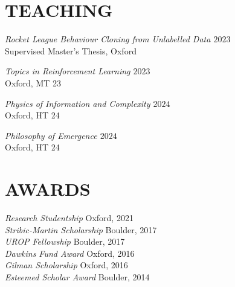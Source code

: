 \documentclass[margin]{res}
\begin{document}
\begin{resume}
                \section{TEACHING}
                {\sl Rocket League Behaviour Cloning from Unlabelled Data \hfill $2023$}\\
                Supervised Master's Thesis, Oxford

                {\sl Topics in Reinforcement Learning \hfill $2023$}\\
                Oxford, MT 23

                {\sl Physics of Information and Complexity \hfill $2024$}\\
                Oxford, HT 24

                {\sl Philosophy of Emergence \hfill $2024$}\\
                Oxford, HT 24

                \section{AWARDS}

                {\sl Research Studentship} \hfill Oxford, 2021 \\
                {\sl Stribic-Martin Scholarship} \hfill Boulder, 2017 \\
                        {\sl UROP Fellowship} \hfill Boulder, 2017 \\
                        {\sl Dawkins Fund Award} \hfill Oxford, 2016 \\
                        {\sl Gilman Scholarship} \hfill Oxford, 2016 \\
                        {\sl Esteemed Scholar Award} \hfill Boulder, 2014 \\




\end{resume}
\end{document}
